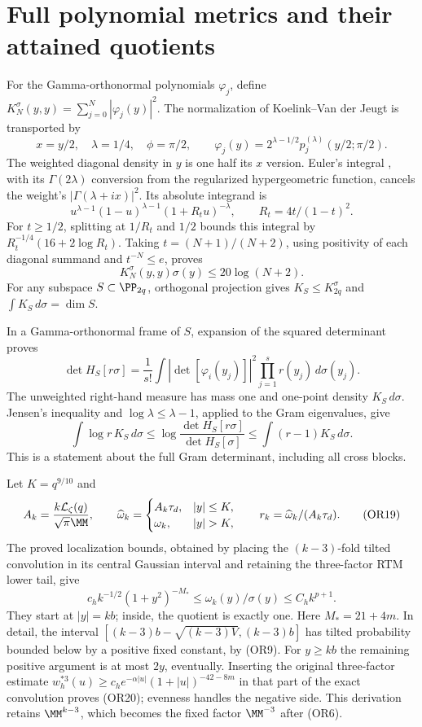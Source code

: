 \documentclass[11pt,a4paper]{article}
\begin{document}
\section{Full polynomial metrics and their attained quotients}
For the Gamma-orthonormal polynomials \(\varphi_j\), define
\(K_N^\sigma(y,y)=\sum_{j=0}^N|\varphi_j(y)|^2\).
The normalization of Koelink--Van der Jeugt
\cite[Proposition 2.1, (2.9)]{or:KVJ} is transported by
\[
 x=y/2,\quad\lambda=1/4,\quad\phi=\pi/2,\qquad
 \varphi_j(y)=2^{\lambda-1/2}p_j^{(\lambda)}(y/2;\pi/2).
\]
The weighted diagonal density in \(y\) is one half its \(x\) version.
Euler's integral \cite[(15.6.1)]{or:DLMFhyper}, with its
\(\Gamma(2\lambda)\) conversion from the regularized
hypergeometric function, cancels the weight's
\(|\Gamma(\lambda+ix)|^2\).  Its absolute integrand is
\[
 u^{\lambda-1}(1-u)^{\lambda-1}(1+R_tu)^{-\lambda},
 \qquad R_t=4t/(1-t)^2 .
 \]
For \(t\geq1/2\), splitting at \(1/R_t\) and \(1/2\) bounds this
integral by \(R_t^{-1/4}(16+2\log R_t)\).
Taking \(t=(N+1)/(N+2)\), using positivity of each diagonal
summand and \(t^{-N}\leq e\), proves
\[
 K_N^\sigma(y,y)\sigma(y)\leq20\log(N+2).              \tag{OR17}
\]
For any subspace \(S\subset\PP_{2q}\), orthogonal projection gives
\(K_S\leq K_{2q}^\sigma\) and \(\int K_S\,d\sigma=\dim S\).

In a Gamma-orthonormal frame of \(S\), expansion of the squared
determinant proves
\[
 \det H_S[r\sigma]
 =\frac1{s!}\int|\det[\varphi_i(y_j)]|^2
              \prod_{j=1}^s r(y_j)\,d\sigma(y_j).
 \]
The unweighted right-hand measure has mass one and one-point
density \(K_S\,d\sigma\).  Jensen's inequality and
\(\log\lambda\leq\lambda-1\), applied to the Gram eigenvalues, give
\[
 \int\log r\,K_S\,d\sigma
 \leq\log\frac{\det H_S[r\sigma]}{\det H_S[\sigma]}
 \leq\int(r-1)K_S\,d\sigma.                          \tag{OR18}
\]
This is a statement about the full Gram determinant, including all
cross blocks.

Let \(K=q^{9/10}\) and
\[
 A_k=\frac{k\mathcal L_\zeta(q)}{\sqrt\pi\MM},\qquad
 \widehat\omega_k=
 \begin{cases}A_k\tau_d,&|y|\leq K,\\
 \omega_k,&|y|>K,\end{cases}\qquad
 r_k=\widehat\omega_k/(A_k\tau_d).                    \tag{OR19}
\]
The proved localization bounds, obtained by placing the
\((k-3)\)-fold tilted convolution in its central Gaussian interval
and retaining the three-factor RTM lower tail, give
\[
 c_h k^{-1/2}(1+y^2)^{-M_*}
 \leq\omega_k(y)/\sigma(y)\leq C_hk^{p+1}.            \tag{OR20}
\]
They start at \(|y|=kb\); inside, the quotient is exactly one.
Here \(M_*=21+4m\).  In detail, the interval
\([(k-3)b-\sqrt{(k-3)V},(k-3)b]\) has tilted probability bounded
below by a positive fixed constant, by (OR9).  For \(y\geq kb\)
the remaining positive argument is at most \(2y\), eventually.
Inserting the original three-factor estimate
\(w_h^{*3}(u)\geq c_he^{-\alpha|u|}(1+|u|)^{-42-8m}\)
in that part of the exact convolution proves (OR20); evenness
handles the negative side.  This derivation retains \(\MM^{k-3}\),
which becomes the fixed factor \(\MM^{-3}\) after (OR6).
\end{document}
